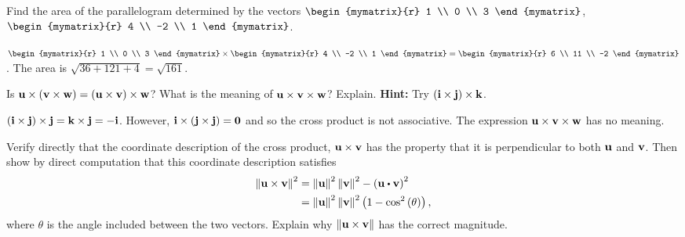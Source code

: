 \begin{enumialphparenastyle}
\begin{ex}
  Find the area of the parallelogram determined by the vectors
  $\begin{mymatrix}{r}
    1 \\
    0 \\
    3
  \end{mymatrix} $, $\begin{mymatrix}{r}
    4 \\
    -2 \\
    1
  \end{mymatrix}$.
  \begin{sol}
    $\begin{mymatrix}{r}
      1 \\
      0 \\
      3
    \end{mymatrix} \times
    \begin{mymatrix}{r}
      4 \\
      -2 \\
      1
    \end{mymatrix} =\begin{mymatrix}{r}
      6 \\
      11 \\
      -2
    \end{mymatrix}$. The area is $\sqrt{36+121+4}= \sqrt{161}$.
  \end{sol}
\end{ex}


\begin{ex}
  Is
  $\mbox{\bf u}\times \left(\mbox{\bf v}\times \mbox{\bf w}\right) =\left( \mbox{\bf u}\times
    \mbox{\bf v}\right) \times \mbox{\bf w}$? What is the meaning of
  $\mbox{\bf u}\times \mbox{\bf v}\times \mbox{\bf w}$? Explain.  \textbf{Hint:}
  Try $\left(\mbox{\bf i}\times \mbox{\bf j} \right)\times \mbox{\bf k}$.
  \begin{sol}
    $\left(\mbox{\bf i}\times \mbox{\bf j}\right) \times \mbox{\bf j}=\mbox{\bf k}\times
    \mbox{\bf j}=-\mbox{\bf i}$. However,
    $\mbox{\bf i}\times \left(\mbox{\bf j}\times \mbox{\bf j} \right) =\mbox{\bf 0}$ and so
    the cross product is not associative. The expression
    $\mbox{\bf u}\times \mbox{\bf v}\times \mbox{\bf w}$ has no meaning.
  \end{sol}
\end{ex}

\begin{ex}
  Verify directly that the coordinate description of the cross
  product, $\mbox{\bf u}\times \mbox{\bf v}$ has the property that it is
  perpendicular to both $\mbox{\bf u}$ and $\mbox{\bf v}$. Then show by direct
  computation that this coordinate description satisfies
  \begin{align*}
    \norm{\vect{u}\times \vect{v}} ^{2}
    & =\norm{\vect{u}
      } ^{2}\norm{\vect{v}} ^{2}-\tup{\vect{u}\dotprod \vect{v}} ^{2} \\
    & =\norm{\vect{u}} ^{2}\norm{\vect{v}}
      ^{2}\tup{1-\cos ^{2}\tup{\theta } },
  \end{align*}
  where $\theta$ is the angle included between the two
  vectors. Explain why $\left\|\mbox{\bf u}\times\mbox{\bf v}\right\|$ has the
  correct magnitude.
\end{ex}


\end{enumialphparenastyle}
